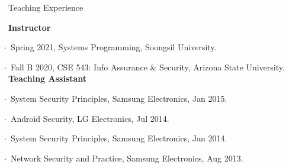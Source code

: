 \documentclass{resume} %
\begin{document}
\begin{rSection}{\faGenderless~Teaching Experience}

    \textbullet~{\bf Instructor} \\
        \strut\hspace{1cm}$\cdot$~Spring 2021, Systems Programming, Soongsil University.\\
        \strut\hspace{1cm}$\cdot$~Fall B 2020, CSE 543: Info Assurance \& Security, Arizona State University.\\

	\textbullet~{\bf Teaching Assistant} \\
		\strut\hspace{1cm}$\cdot$~System Security Principles, Samsung Electronics, Jan 2015.\\
		\strut\hspace{1cm}$\cdot$~Android Security, LG Electronics, Jul 2014.\\
		\strut\hspace{1cm}$\cdot$~System Security Principles, Samsung Electronics, Jan 2014.\\
		\strut\hspace{1cm}$\cdot$~Network Security and Practice, Samsung Electronics, Aug 2013.

	\vspace{3mm}
\end{rSection}	

%





\end{document}
